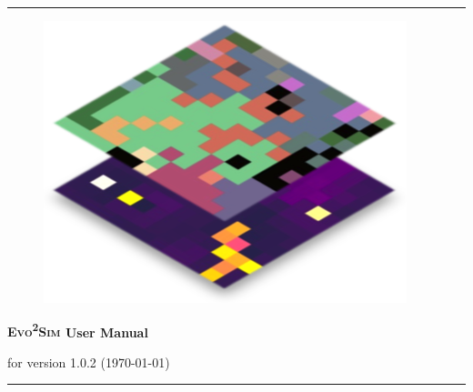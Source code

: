 \documentclass[english, a4paper, 12pt]{report}
\newcommand{\packageName}{\textsc{Evo\textsuperscript{2}Sim}}
\newcommand{\packageVersion}{1.0.2}
\begin{document}


\thispagestyle{empty}

\rule{\linewidth}{2pt}
\begin{figure}[!h]
\centering
\includegraphics[width=0.2\linewidth]{./figures/icon.png}
\end{figure}

\begin{center}
{\Huge {\bf {\packageName} User Manual}}

for version {\packageVersion} (\today)
\end{center}
\rule{\linewidth}{2pt}

\newpage

\tableofcontents

\newpage










\appendix




\end{document}
